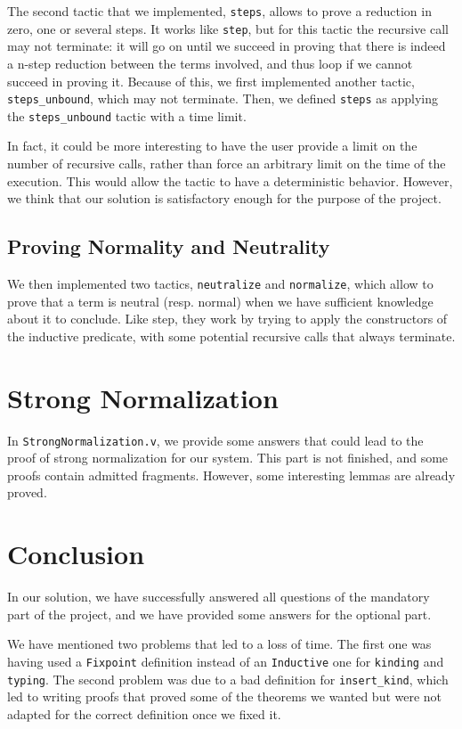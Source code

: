 \documentclass[a4paper,11pt]{article}
\begin{document}
The second tactic that we implemented, \verb|steps|, allows to prove
a reduction in zero, one or several steps. It works like \verb|step|,
but for this tactic the recursive call may not terminate: it will
go on until we succeed in proving that there is indeed a n-step
reduction between the terms involved, and thus loop if we cannot
succeed in proving it. Because of this, we first implemented another
tactic, \verb|steps_unbound|, which may not terminate. Then, we
defined \verb|steps| as applying the \verb|steps_unbound| tactic with
a time limit.

In fact, it could be more interesting to have the user provide a limit
on the number of recursive calls, rather than force an arbitrary limit
on the time of the execution. This would allow the tactic to have a
deterministic behavior. However, we think that our solution is
satisfactory enough for the purpose of the project.

\subsection{Proving Normality and Neutrality}

We then implemented two tactics, \verb|neutralize| and
\verb|normalize|, which allow to prove that a term is neutral
(resp. normal) when we have sufficient knowledge about it to conclude.
Like step, they work by trying to apply the constructors of the
inductive predicate, with some potential recursive calls that always
terminate.

\section{Strong Normalization}

In \verb|StrongNormalization.v|, we provide some answers that could
lead to the proof of strong normalization for our system. This part is
not finished, and some proofs contain admitted fragments. However,
some interesting lemmas are already proved.

\section*{Conclusion}

In our solution, we have successfully answered all questions of the
mandatory part of the project, and we have provided some answers for
the optional part.

We have mentioned two problems that led to a loss of time. The first
one was having used a \verb|Fixpoint| definition instead of an
\verb|Inductive| one for \verb|kinding| and \verb|typing|. The second
problem was due to a bad definition for \verb|insert_kind|, which led
to writing proofs that proved some of the theorems we wanted but were
not adapted for the correct definition once we fixed it.
\end{document}
